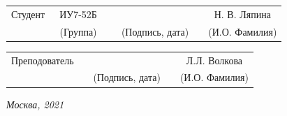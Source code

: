 \noindent
{}
\\

\noindent
{}
\\

\vspace{1.5cm}
\noindent
\begin{tabular}{l c c c c c}
    Студент      & ~ИУ7-52Б~               & \hspace{3.5cm} & \hspace{3.5cm}                 & &  Н. В. Ляпина \\\cline{2-2}\cline{4-4} \cline{6-6}
    \hspace{3cm} & {\footnotesize(Группа)} &                & {\footnotesize(Подпись, дата)} & & {\footnotesize(И.О. Фамилия)}
\end{tabular}

\vspace{1cm}

\noindent
\begin{tabular}{l c c c c}
    Преподователь & \hspace{6cm}   & \hspace{3.5cm}                 & & Л.Л. Волкова \\\cline{3-3} \cline{5-5} 
    \hspace{3cm}  &                & {\footnotesize(Подпись, дата)} & & {\footnotesize(И.О. Фамилия)}
\end{tabular}

\begin{center}	
	\vfill
	\large \textit {Москва, 2021}
\end{center}

\thispagestyle {empty}
\pagebreak
